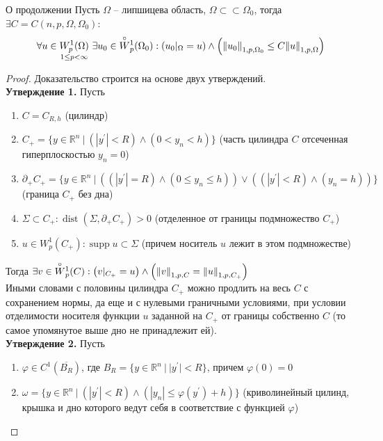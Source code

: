 \documentclass[12pt,a4paper]{article}
\newcommand{\Real}{\mathbb{R}}
\newcommand{\ssubset}{\subset \subset}
\newcommand{\zeroW}[2]{\overset{\circ}{W}{}_{#1}^{#2}}
\DeclareMathOperator\supp{supp}
\DeclareMathOperator\dist{dist}
\begin{document}
\begin{theorem}{О продолжении}{}\label{mth:1}
	Пусть $\Omega$ -- липшицева область, $\Omega \ssubset \Omega_0$, тогда $\exists C = C(n, p, \Omega, \Omega_0)$:
	\begin{equation*}
		\forall u \in \underset{1 \leq p < \infty}{W_p^1 (\Omega)} \ \exists u_0 \in \zeroW{p}{1} (\Omega_0): \left(u_0 |_\Omega = u\right) \wedge \left(\norm{u_0}_{1, p, \Omega_0} \leq C \norm{u}_{1, p, \Omega}\right)
	\end{equation*}
\end{theorem}
\begin{proof}
	Доказательство строится на основе двух утверждений. \\
	\textbf{Утверждение 1.} Пусть
	\begin{enumerate}
		\item $C = C_{R, h}$ (цилиндр)
		\item $C_+ = \{ y \in \Real^n \ | \ (|y^\prime| < R) \wedge (0 < y_n < h) \}$ (часть цилиндра $C$ отсеченная гиперплоскостью $y_n = 0$)
		\item $\partial_+ C_+ = \{ y \in \Real^n \ | \ \left(\left(|y^\prime| = R\right)\wedge \left(0 \leq y_n \leq h\right)\right)\vee\left(\left(|y^\prime| < R\right)\wedge\left(y_n = h\right)\right)\}$ (граница $C_+$ без дна)
		\item $\Sigma \subset C_+: \dist(\Sigma, \partial_+ C_+) > 0$ (отделенное от границы подмножество $C_+$)
		\item $u \in W_p^1 (C_+): \supp{u} \subset \Sigma$ (причем носитель $u$ лежит в этом подмножестве)
	\end{enumerate}
	Тогда $\exists v \in \zeroW{p}{1} (C): \left(v|_{C_+} = u\right) \wedge \left(\norm{v}_{1, p, C} = \norm{u}_{1, p, C_+}\right)$ \\ Иными словами с половины цилиндра $C_+$ можно продлить на весь $C$ с сохранением нормы, да еще и с нулевыми граничными условиями, при условии отделимости носителя функции $u$ заданной на $C_+$ от границы собственно $C$ (то самое упомянутое выше дно не принадлежит ей). \\
	\textbf{Утверждение 2.} Пусть
	\begin{enumerate}
		\item $\varphi \in C^1 (\overline{B_R})$, где $B_R = \{ y \in \Real^n \ | \ |y^\prime| < R\}$, причем $\varphi(0) = 0$
		\item $\omega = \{ y \in \Real^n \ | \ (|y^\prime| < R) \wedge (|y_n| \leq \varphi (y^\prime) + h) \}$ (криволинейный цилинд, крышка и дно которого ведут себя в соответствие с функцией $\varphi$)

\end{enumerate}
\end{proof}
\end{document}
